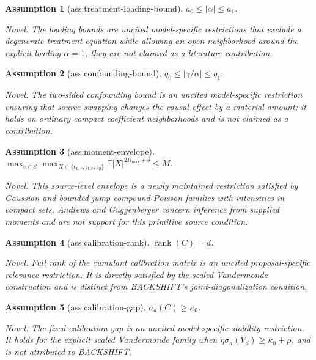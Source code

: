 \documentclass{article}
\newtheorem{assumption}{Assumption}
\begin{document}
\begin{assumption}[ass:treatment-loading-bound]\label{ass:treatment-loading-bound}
\(a_0\le\lvert\alpha\rvert\le a_1\).
\par\smallskip\noindent\emph{Novel.} The loading bounds are uncited model-specific restrictions that exclude a degenerate treatment equation while allowing an open neighborhood around the explicit loading \(\alpha=1\); they are not claimed as a literature contribution.
\end{assumption}

\begin{assumption}[ass:confounding-bound]\label{ass:confounding-bound}
\(q_0\le\lvert\gamma/\alpha\rvert\le q_1\).
\par\smallskip\noindent\emph{Novel.} The two-sided confounding bound is an uncited model-specific restriction ensuring that source swapping changes the causal effect by a material amount; it holds on ordinary compact coefficient neighborhoods and is not claimed as a contribution.
\end{assumption}

\begin{assumption}[ass:moment-envelope]\label{ass:moment-envelope}
\(\max_{e\in\mathcal E}\max_{X\in\{\epsilon_{u,e},\epsilon_{t,e},\epsilon_y\}}\mathbb E\lvert X\rvert^{2R_{\max}+\delta}\le M\).
\par\smallskip\noindent\emph{Novel.} This source-level envelope is a newly maintained restriction satisfied by Gaussian and bounded-jump compound-Poisson families with intensities in compact sets.  Andrews and Guggenberger concern inference from supplied moments and are not support for this primitive source condition.
\end{assumption}

\begin{assumption}[ass:calibration-rank]\label{ass:calibration-rank}
\(\operatorname{rank}(C)=d\).
\par\smallskip\noindent\emph{Novel.} Full rank of the cumulant calibration matrix is an uncited proposal-specific relevance restriction.  It is directly satisfied by the scaled Vandermonde construction and is distinct from BACKSHIFT's joint-diagonalization condition.
\end{assumption}

\begin{assumption}[ass:calibration-gap]\label{ass:calibration-gap}
\(\sigma_d(C)\ge\kappa_0\).
\par\smallskip\noindent\emph{Novel.} The fixed calibration gap is an uncited model-specific stability restriction.  It holds for the explicit scaled Vandermonde family when \(\eta\sigma_d(V_d)\ge\kappa_0+\rho\), and is not attributed to BACKSHIFT.
\end{assumption}
\end{document}
